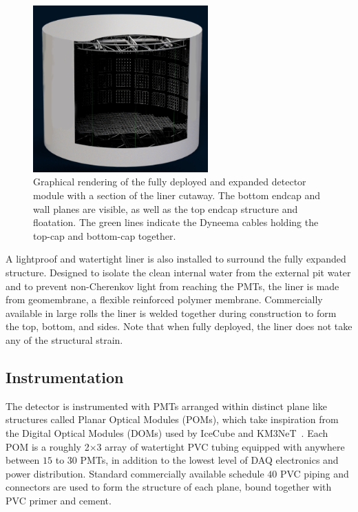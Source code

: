 \begin{figure} %
    \includegraphics[width=0.6\textwidth]{diagrams/4-chips/chips_render_1.png}
    \caption[Graphical rendering of the \chipsfive detector.]
    {Graphical rendering of the fully deployed and expanded \chipsfive detector module with a
        section of the liner cutaway. The bottom endcap and wall planes are visible, as well as
        the top endcap structure and floatation. The green lines indicate the Dyneema cables
        holding the top-cap and bottom-cap together.}
    \label{fig:chips_render}
\end{figure}

A lightproof and watertight liner is also installed to surround the fully expanded structure.
Designed to isolate the clean internal water from the external pit water and to prevent
non-Cherenkov light from reaching the PMTs, the liner is made from geomembrane, a flexible
reinforced polymer membrane. Commercially available in large rolls the liner is welded together
during construction to form the top, bottom, and sides. Note that when fully deployed, the liner
does not take any of the structural strain.

\subsection{Instrumentation} %
\label{sec:chips_detector_instrumentation} %

The \chipsfive detector is instrumented with PMTs arranged within distinct plane like structures
called Planar Optical Modules (POMs), which take inspiration from the Digital Optical Modules
(DOMs) used by IceCube and KM3NeT~\cite{hanson2006, eijk2015}. Each POM is a roughly
\unit{2}{}$\times$\unit{3}{} array of watertight PVC tubing equipped with
anywhere between $15$ to $30$ PMTs, in addition to the lowest level of DAQ electronics and power
distribution. Standard commercially available schedule $40$ PVC piping and connectors are used to
form the structure of each plane, bound together with PVC primer and cement.

